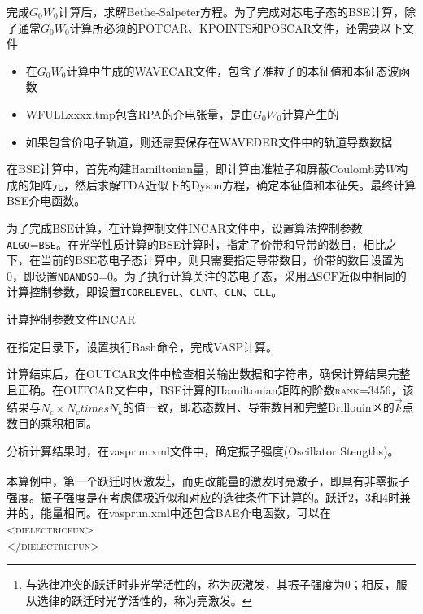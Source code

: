 完成$G_0W_0$计算后，求解\textrm{Bethe-Salpeter}方程。为了完成对芯电子态的\textrm{BSE}计算，除了通常$G_0W_0$计算所必须的\textrm{POTCAR}、\textrm{KPOINTS}和\textrm{POSCAR}文件，还需要以下文件
\begin{itemize}
	\item 在$G_0W_0$计算中生成的\textrm{WAVECAR}文件，包含了准粒子的本征值和本征态波函数
	\item \textrm{WFULLxxxx.tmp}包含\textrm{RPA}的介电张量，是由$G_0W_0$计算产生的
	\item 如果包含价电子轨道，则还需要保存在\textrm{WAVEDER}文件中的轨道导数数据
\end{itemize}
在\textrm{BSE}计算中，首先构建\textrm{Hamiltonian}量，即计算由准粒子和屏蔽\textrm{Coulomb}势$W$构成的矩阵元，然后求解\textrm{TDA}近似下的\textrm{Dyson}方程，确定本征值和本征矢。最终计算\textrm{BSE}介电函数。

为了完成\textrm{BSE}计算，在计算控制文件\textrm{INCAR}文件中，设置算法控制参数\texttt{ALGO}=\texttt{BSE}。在光学性质计算的\textrm{BSE}计算时，指定了价带和导带的数目，相比之下，在当前的\textrm{BSE}芯电子态计算中，则只需要指定导带数目，价带的数目设置为0，即设置\texttt{NBANDSO}=0。为了执行计算关注的芯电子态，采用$\Delta\mathrm{SCF}$近似中相同的计算控制参数，即设置\texttt{ICORELEVEL}、\texttt{CLNT}、\texttt{CLN}、\texttt{CLL}。

计算控制参数文件\textrm{INCAR}

在指定目录下，设置执行\textrm{Bash}命令，完成\textrm{VASP}计算。

计算结束后，在\textrm{OUTCAR}文件中检查相关输出数据和字符串，确保计算结果完整且正确。在\textrm{OUTCAR}文件中，\textrm{BSE}计算的\textrm{Hamiltonian}矩阵的阶数\textsc{rank}=3456，该结果与$N_c\times N_vtimes N_k$的值一致，即芯态数目、导带数目和完整\textrm{Brillouin}区的$\vec k$点数目的乘积相同。

分析计算结果时，在\textrm{vasprun.xml}文件中，确定振子强度\textrm{(Oscillator Stengths)}。

本算例中，第一个跃迁时灰激发\footnote{与选律冲突的跃迁时非光学活性的，称为灰激发，其振子强度为0；相反，服从选律的跃迁时光学活性的，称为亮激发。}，而更改能量的激发时亮激子，即具有非零振子强度。振子强度是在考虑偶极近似和对应的选律条件下计算的。跃迁2，3和4时兼并的，能量相同。在\textrm{vasprun.xml}中还包含\textrm{BAE}介电函数，可以在\\
\textsc{<dielectricfun>}\\
\textsc{</dielectricfun>}

